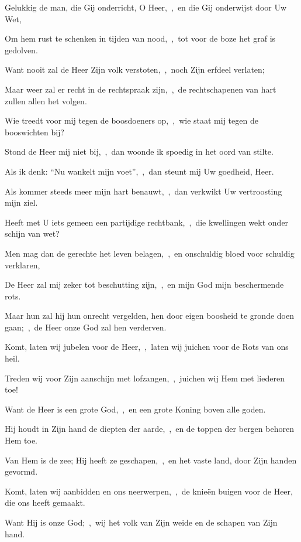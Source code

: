 \documentclass[12pt,twoside,a5paper]{article}
\begin{document}
\begin{halfparskip}
  Gelukkig de man, die Gij onderricht, O Heer,~\sep\ en die Gij onderwijst door Uw Wet,

  Om hem rust te schenken in tijden van nood,~\sep\ tot voor de boze het graf is gedolven.

  Want nooit zal de Heer Zijn volk verstoten,~\sep\ noch Zijn erfdeel verlaten;

  Maar weer zal er recht in de rechtspraak zijn,~\sep\ de rechtschapenen van hart zullen allen het volgen.

  Wie treedt voor mij tegen de boosdoeners op,~\sep\ wie staat mij tegen de booswichten bij?

  Stond de Heer mij niet bij,~\sep\ dan woonde ik spoedig in het oord van stilte.

  Als ik denk: ``Nu wankelt mijn voet'',~\sep\ dan steunt mij Uw goedheid, Heer.

  Als kommer steeds meer mijn hart benauwt,~\sep\ dan verkwikt Uw vertroosting mijn ziel.

  Heeft met U iets gemeen een partijdige rechtbank,~\sep\ die kwellingen wekt onder schijn van wet?

  Men mag dan de gerechte het leven belagen,~\sep\ en onschuldig bloed voor schuldig verklaren,

  De Heer zal mij zeker tot beschutting zijn,~\sep\ en mijn God mijn beschermende rots.

  Maar hun zal hij hun onrecht vergelden, hen door eigen boosheid te gronde doen gaan;~\sep\ de Heer onze God zal hen verderven.
\end{halfparskip}



\begin{halfparskip}
  Komt, laten wij jubelen voor de Heer,~\sep\ laten wij juichen voor de Rots van ons heil.


  Treden wij voor Zijn aanschijn met lofzangen,~\sep\ juichen wij Hem met liederen toe!

  Want de Heer is een grote God,~\sep\ en een grote Koning boven alle goden.

  Hij houdt in Zijn hand de diepten der aarde,~\sep\ en de toppen der bergen behoren Hem toe.

  Van Hem is de zee; Hij heeft ze geschapen,~\sep\ en het vaste land, door Zijn handen gevormd.

  Komt, laten wij aanbidden en ons neerwerpen,~\sep\ de knieën buigen voor de Heer, die ons heeft gemaakt.

  Want Hij is onze God;~\sep\ wij het volk van Zijn weide en de schapen van Zijn hand.
\end{halfparskip}
\end{document}
